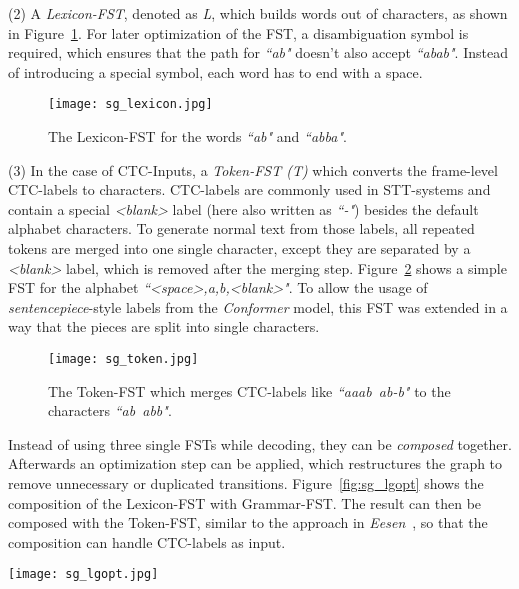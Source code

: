 \documentclass[a4paper]{article}
\begin{document}
\noindent(2) A \textit{Lexicon-FST}, denoted as \textit{L}, which builds words out of characters, as shown in Figure~\ref{fig:sg_lexicon}. For later optimization of the FST, a disambiguation symbol is required, which ensures that the path for \textit{``ab"} doesn't also accept \textit{``abab"}. Instead of introducing a special symbol, each word has to end with a space. 

\begin{figure}[!htbp]
	\centering
	\texttt{[image: sg\_lexicon.jpg]}
	\caption{The Lexicon-FST for the words \textit{``ab"} and \textit{``abba"}.}
	\label{fig:sg_lexicon}
\end{figure}

\noindent (3) In the case of CTC-Inputs, a \textit{Token-FST (T)} which converts the frame-level CTC-labels to characters. CTC-labels are commonly used in STT-systems and contain a special \textit{\textless{}blank\textgreater{}} label (here also written as \textit{``-"}) besides the default alphabet characters. To generate normal text from those labels, all repeated tokens are merged into one single character, except they are separated by a \textit{\textless{}blank\textgreater{}} label, which is removed after the merging step. Figure~\ref{fig:sg_token} shows a simple FST for the alphabet \textit{``\textless{}space\textgreater{},a,b,\textless{}blank\textgreater{}"}. To allow the usage of \textit{sentencepiece}-style labels \cite{SNTPC} from the \textit{Conformer} model, this  FST was extended in a way that the pieces are split into single characters.

\begin{figure}[!htbp]
	\centering
	\texttt{[image: sg\_token.jpg]}
	\caption{The Token-FST which merges CTC-labels like  \textit{``aaab~ab-b"} to the characters \textit{``ab~abb"}.}
	\label{fig:sg_token}
\end{figure}

Instead of using three single FSTs while decoding, they can be \textit{composed} together. Afterwards an optimization step can be applied, which restructures the graph to remove unnecessary or duplicated transitions. Figure~\ref{fig:sg_lgopt} shows the composition of the Lexicon-FST with Grammar-FST. The result can then be composed with the Token-FST, similar to the approach in \textit{Eesen}~\cite{EESEN}, so that the composition can handle CTC-labels as input.

\begin{figure*}[!htbp]
	\centering
	\texttt{[image: sg\_lgopt.jpg]}
	\caption{Optimized LG-FST which has characters as input and the sentences from the simple grammar above as output.}
	\label{fig:sg_lgopt}
\end{figure*}
\end{document}
